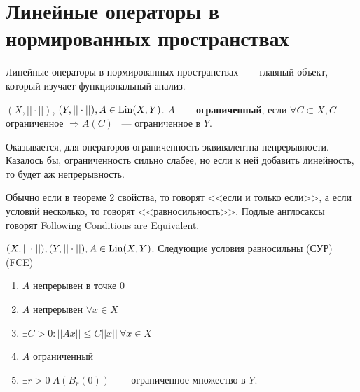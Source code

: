 \documentclass[document]{subfiles}
\begin{document}
\section{Линейные операторы в нормированных пространствах}
Линейные операторы в нормированных пространствах ~--- главный объект, который изучает функциональный анализ.
\begin{definition}
    $(X, || \cdot||)$, $(Y, || \cdot ||), A \in \operatorname{Lin}(X,Y) $. $A$ ~--- \textbf{ ограниченный}, если $\forall C \subset X, C$ ~--- ограниченное $\Rightarrow A(C)$ ~--- ограниченное 
    в $Y$.
\end{definition}
Оказывается, для операторов ограниченность эквивалентна непрерывности. Казалось бы, ограниченность сильно слабее, но если к ней добавить  линейность, то будет аж непрерывность.

Обычно если в теореме 2 свойства, то говорят <<если и только если>>, а если условий несколько, то говорят <<равносильность>>. Подлые англосаксы говорят Following Conditions are Equivalent.
 
\begin{theorem}
    $(X, ||\cdot||), (Y, ||\cdot||), A \in \operatorname{Lin}(X,Y)$. Следующие условия равносильны (СУР) (FCE)
    \begin{enumerate}
        \item $A$ непрерывен в точке $0$ 
        \item $A$ непрерывен $\forall x \in X$  %
        \item $\exists C > 0 : ||Ax|| \leq C||x|| \: \forall x \in X $
        \item $A$ ограниченный
        \item $\exists r > 0 \: A(B_r(0))$ ~--- ограниченное множество в $Y$.
    \end{enumerate}
\end{theorem}
 
\end{document}
